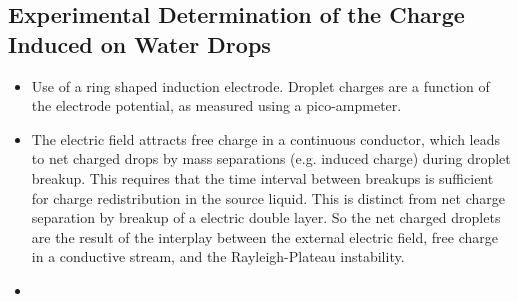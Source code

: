 \documentclass{jfm}
\begin{document}
\subsection{Experimental Determination of the Charge Induced on Water Drops}
\begin{itemize}
\item Use of a ring shaped induction electrode. Droplet charges are a function of the electrode potential, as measured using a pico-ampmeter.
\item The electric field attracts free charge in a continuous conductor, which leads to net charged drops by mass separations (e.g. induced charge) during droplet breakup. This requires that the time interval between breakups is sufficient for charge redistribution in the source liquid. This is distinct from net charge separation by breakup of a electric double layer. So the net charged droplets are the result of the interplay between the external electric field, free charge in a conductive stream, and the Rayleigh-Plateau instability.
\item 
\end{itemize}
\citep{magarvey_experimental_1962} 



\end{document}
